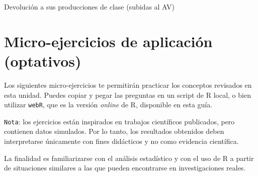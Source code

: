 \documentclass[
  spanish,
  letterpaper,
  DIV=11,
  numbers=noendperiod]{scrreprt}
\begin{document}
Devolución a sus producciones de clase (subidas al AV)

\section{Micro-ejercicios de aplicación
(optativos)}\label{micro-ejercicios-de-aplicaciuxf3n-optativos-9}

Los siguientes micro-ejercicios te permitirán practicar los conceptos
revisados en esta unidad. Puedes copiar y pegar las preguntas en un
script de R local, o bien utilizar \texttt{webR}, que es la versión
\emph{online} de R, disponible en esta guía.

\texttt{Nota}: los ejercicios están inspirados en trabajos científicos
publicados, pero contienen datos simulados. Por lo tanto, los resultados
obtenidos deben interpretarse únicamente con fines didácticos y no como
evidencia científica.

La finalidad es familiarizarse con el análisis estadístico y con el uso
de R a partir de situaciones similares a las que pueden encontrarse en
investigaciones reales.
\end{document}
